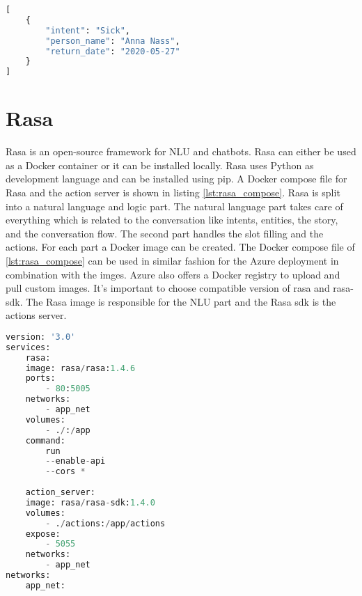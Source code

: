 \begin{lstlisting}[caption={Watson Assistant Request Format}, label={lst:watson_request},captionpos=b,frame=single,language={Python},commentstyle=\color{mygreen},keywordstyle=\color{blue},
    morekeywords={}]                
[
    {
        "intent": "Sick",
        "person_name": "Anna Nass",
        "return_date": "2020-05-27"
    }
]
\end{lstlisting}  


\section{Rasa}
Rasa is an open-source framework for NLU and chatbots.
Rasa\cite{rasa} can either be used as a Docker container or 
it can be installed locally.
Rasa uses Python as development language and can be installed using pip.
A Docker compose file for Rasa and the action server is shown in listing 
\ref{lst:rasa_compose}.
Rasa is split into a natural language and logic part.
The natural language part takes care of everything which is related to 
the conversation like intents, entities, the story, and the conversation flow.
The second part handles the slot filling and the actions.
For each part a Docker image can be created.
The Docker compose file of \ref{lst:rasa_compose} can be used in similar fashion 
for the Azure deployment in combination with the imges.
Azure also offers a Docker registry to upload and pull custom images.
It's important to choose compatible version of rasa and rasa-sdk.
The Rasa image is responsible for the NLU part and the Rasa sdk is the 
actions server.
\begin{lstlisting}[caption={Rasa Docker Compose File}, label={lst:rasa_compose},captionpos=b,frame=single,language={Python},commentstyle=\color{mygreen},keywordstyle=\color{blue},
    morekeywords={}]                
version: '3.0'
services:
    rasa:
    image: rasa/rasa:1.4.6
    ports:
        - 80:5005
    networks: 
        - app_net
    volumes:
        - ./:/app
    command:
        run 
        --enable-api
        --cors *
    
    action_server:
    image: rasa/rasa-sdk:1.4.0    
    volumes:
        - ./actions:/app/actions
    expose: 
        - 5055
    networks: 
        - app_net
networks: 
    app_net:
\end{lstlisting}  
